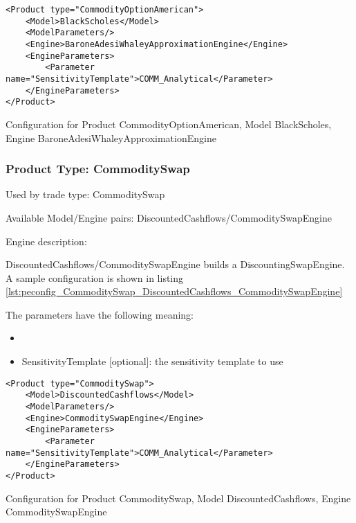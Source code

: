 \begin{longlisting}
\begin{verbatim}
<Product type="CommodityOptionAmerican">
    <Model>BlackScholes</Model>
    <ModelParameters/>
    <Engine>BaroneAdesiWhaleyApproximationEngine</Engine>
    <EngineParameters>
        <Parameter name="SensitivityTemplate">COMM_Analytical</Parameter>
    </EngineParameters>
</Product>
\end{verbatim}
\caption{Configuration for Product CommodityOptionAmerican, Model BlackScholes, Engine BaroneAdesiWhaleyApproximationEngine}
\label{lst:peconfig_CommodityOptionAmerican_BlackScholes_BaroneAdesiWhaleyApproximationEngine}
\end{longlisting}

\subsubsection{Product Type: CommoditySwap}

Used by trade type: CommoditySwap

Available Model/Engine pairs: DiscountedCashflows/CommoditySwapEngine

Engine description:

DiscountedCashflows/CommoditySwapEngine builds a DiscountingSwapEngine. A sample configuration is shown in listing
\ref{lst:peconfig_CommoditySwap_DiscountedCashflows_CommoditySwapEngine}

The parameters have the following meaning:

\begin{itemize}
\item 
\item SensitivityTemplate [optional]: the sensitivity template to use 
\end{itemize}

\begin{longlisting}
\begin{verbatim}
<Product type="CommoditySwap">
    <Model>DiscountedCashflows</Model>
    <ModelParameters/>
    <Engine>CommoditySwapEngine</Engine>
    <EngineParameters>
        <Parameter name="SensitivityTemplate">COMM_Analytical</Parameter>
    </EngineParameters>
</Product>
\end{verbatim}
\caption{Configuration for Product CommoditySwap, Model DiscountedCashflows, Engine CommoditySwapEngine}
\label{lst:peconfig_CommoditySwap_DiscountedCashflows_CommoditySwapEngine}
\end{longlisting}

